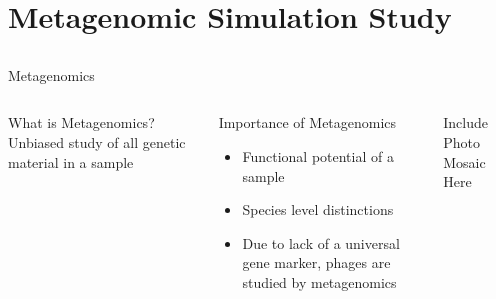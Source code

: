 \documentclass[11pt]{beamer}
\begin{document}
	
\section{Metagenomic Simulation Study}
\subsection{}
	\begin{frame}{Metagenomics}
	\begin{columns}
	\begin{block}{What is Metagenomics?}
	Unbiased study of all genetic material in a sample
	\end{block}
	\begin{block}{Importance of Metagenomics}
	\begin{itemize}
	\item Functional potential of a sample
	\item Species level distinctions
	\item Due to lack of a universal gene marker, phages are studied by metagenomics
	\end{itemize}
	\end{block}
	
	Include Photo Mosaic Here
	\end{columns}
	\end{frame}
	
\end{document}
